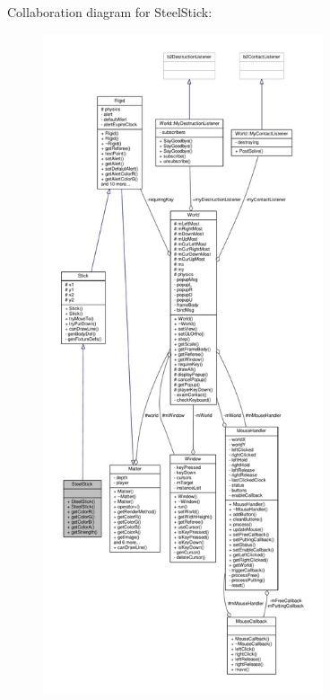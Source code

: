 Collaboration diagram for Steel\+Stick\+:
\nopagebreak
\begin{figure}[H]
\begin{center}
\leavevmode
\includegraphics[height=550pt]{classSteelStick__coll__graph}
\end{center}
\end{figure}
